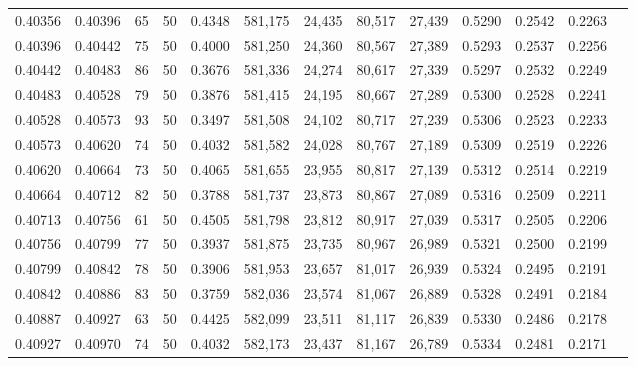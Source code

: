 \begin{tabular}{rrrrrrrrrrrrr}
0.40356 & 0.40396 &    65 &  50 &                                     0.4348 & 581,175 &  24,435 &  80,517 &  27,439 & 0.5290 & 0.2542 & 0.2263 \\
0.40396 & 0.40442 &    75 &  50 &                                     0.4000 & 581,250 &  24,360 &  80,567 &  27,389 & 0.5293 & 0.2537 & 0.2256 \\
0.40442 & 0.40483 &    86 &  50 &                                     0.3676 & 581,336 &  24,274 &  80,617 &  27,339 & 0.5297 & 0.2532 & 0.2249 \\
0.40483 & 0.40528 &    79 &  50 &                                     0.3876 & 581,415 &  24,195 &  80,667 &  27,289 & 0.5300 & 0.2528 & 0.2241 \\
0.40528 & 0.40573 &    93 &  50 &                                     0.3497 & 581,508 &  24,102 &  80,717 &  27,239 & 0.5306 & 0.2523 & 0.2233 \\
0.40573 & 0.40620 &    74 &  50 &                                     0.4032 & 581,582 &  24,028 &  80,767 &  27,189 & 0.5309 & 0.2519 & 0.2226 \\
0.40620 & 0.40664 &    73 &  50 &                                     0.4065 & 581,655 &  23,955 &  80,817 &  27,139 & 0.5312 & 0.2514 & 0.2219 \\
0.40664 & 0.40712 &    82 &  50 &                                     0.3788 & 581,737 &  23,873 &  80,867 &  27,089 & 0.5316 & 0.2509 & 0.2211 \\
0.40713 & 0.40756 &    61 &  50 &                                     0.4505 & 581,798 &  23,812 &  80,917 &  27,039 & 0.5317 & 0.2505 & 0.2206 \\
0.40756 & 0.40799 &    77 &  50 &                                     0.3937 & 581,875 &  23,735 &  80,967 &  26,989 & 0.5321 & 0.2500 & 0.2199 \\
0.40799 & 0.40842 &    78 &  50 &                                     0.3906 & 581,953 &  23,657 &  81,017 &  26,939 & 0.5324 & 0.2495 & 0.2191 \\
0.40842 & 0.40886 &    83 &  50 &                                     0.3759 & 582,036 &  23,574 &  81,067 &  26,889 & 0.5328 & 0.2491 & 0.2184 \\
0.40887 & 0.40927 &    63 &  50 &                                     0.4425 & 582,099 &  23,511 &  81,117 &  26,839 & 0.5330 & 0.2486 & 0.2178 \\
0.40927 & 0.40970 &    74 &  50 &                                     0.4032 & 582,173 &  23,437 &  81,167 &  26,789 & 0.5334 & 0.2481 & 0.2171 \\

\end{tabular}
